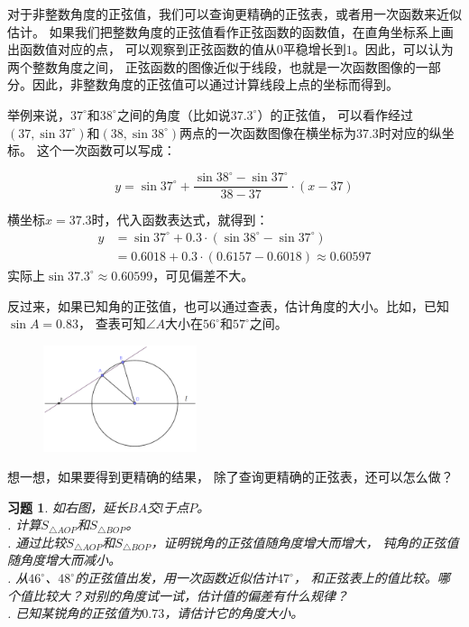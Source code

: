 \documentclass[12pt,UTF8]{ctexbook}
\newtheorem{xt}{习题}[section]
\begin{document}
对于非整数角度的正弦值，我们可以查询更精确的正弦表，或者用一次函数来近似估计。
如果我们把整数角度的正弦值看作正弦函数的函数值，在直角坐标系上画出函数值对应的点，
可以观察到正弦函数的值从$0$平稳增长到$1$。因此，可以认为两个整数角度之间，
正弦函数的图像近似于线段，也就是一次函数图像的一部分。因此，非整数角度的正弦值可以通过计算线段上点的坐标而得到。

举例来说，$37^\circ$和$38^\circ$之间的角度（比如说$37.3^\circ$）的正弦值，
可以看作经过$(37, \sin 37^\circ)$和$(38, \sin 38^\circ)$两点的一次函数图像在横坐标为$37.3$时对应的纵坐标。
这个一次函数可以写成：

$$ y = \sin 37^\circ + \frac{\sin 38^\circ - \sin 37^\circ}{38 - 37} \cdot (x - 37)$$

横坐标$x=37.3$时，代入函数表达式，就得到：
\begin{align*}
    y &= \sin 37^\circ + 0.3\cdot(\sin 38^\circ - \sin 37^\circ )  \\
    &= 0.6018 + 0.3 \cdot (0.6157 - 0.6018) \approx 0.60597 
\end{align*}
实际上$\sin 37.3^\circ \approx 0.60599$，可见偏差不大。

反过来，如果已知角的正弦值，也可以通过查表，估计角度的大小。比如，已知$\sin A = 0.83$，
查表可知$\angle A$大小在$56^\circ$和$57^\circ$之间。

\begin{figure} %
    \vspace{-25pt}
    \flushright
    \includegraphics[width=0.4\textwidth]{tu/正弦习题1.png}
\end{figure}

想一想，如果要得到更精确的结果，
除了查询更精确的正弦表，还可以怎么做？

\begin{xt}
    如右图，延长$BA$交$l$于点$P$。\\
    . 计算$S_{\triangle AOP}$和$S_{\triangle BOP}$。 \\
    . 通过比较$S_{\triangle AOP}$和$S_{\triangle BOP}$，证明锐角的正弦值随角度增大而增大，
    钝角的正弦值随角度增大而减小。 \\
    . 从$46^\circ$、$48^\circ$的正弦值出发，用一次函数近似估计$47^\circ$，
    和正弦表上的值比较。哪个值比较大？对别的角度试一试，估计值的偏差有什么规律？ \\
    . 已知某锐角的正弦值为$0.73$，请估计它的角度大小。
\end{xt}
\end{document}
